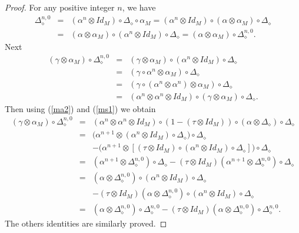 \documentclass{article}
\theoremstyle{definition}
\theoremstyle{remark}
\numberwithin{equation}{section}
\begin{document}
\begin{proof}
For any positive integer $n$, we have
 \begin{eqnarray}
  \Delta^{n,0}_\diamond&=&(\alpha^n\otimes Id_M)\circ\Delta_\diamond\circ\alpha_M
=(\alpha^n\otimes Id_M)\circ(\alpha\otimes\alpha_M)\circ\Delta_\diamond\nonumber\\
&=&(\alpha\otimes \alpha_M)\circ(\alpha^n\otimes Id_M)\circ\Delta_\diamond=(\alpha\otimes\alpha_M)\circ\Delta^{n,0}_\diamond.\nonumber
 \end{eqnarray}
Next
\begin{eqnarray}
(\gamma\otimes\alpha_M)\circ \Delta^{n,0}_\diamond
&=&(\gamma\otimes\alpha_M)\circ(\alpha^n\otimes Id_M)\circ\Delta_\diamond\nonumber\\
&=&(\gamma\circ\alpha^n\otimes\alpha_M)\circ\Delta_\diamond\nonumber\\
&=&(\gamma\circ(\alpha^n\otimes\alpha^n)\otimes\alpha_M)\circ\Delta_\diamond\nonumber\\
&=&(\alpha^n\otimes\alpha^n\otimes Id_M)\circ(\gamma\otimes\alpha_M)\circ\Delta_\diamond\nonumber.
\end{eqnarray}
Then using (\ref{ma2}) and (\ref{ms1}) we obtain
\begin{eqnarray}
 (\gamma\otimes\alpha_M)\circ\Delta^{n,0}_\diamond
&=&(\alpha^n\otimes\alpha^n\otimes Id_M)\circ(1-(\tau\otimes Id_M))\circ(\alpha\otimes\Delta_\diamond)\circ\Delta_\diamond\nonumber\\
&=&\Big(\alpha^{n+1}\otimes(\alpha^n\otimes Id_M)\circ\Delta_\diamond\Big)\circ\Delta_\diamond\nonumber\\
&&- \Big(\alpha^{n+1}\otimes[(\tau\otimes Id_M)\circ(\alpha^n\otimes Id_M)\circ\Delta_\diamond]\Big)\circ\Delta_\diamond\nonumber\\
&=&(\alpha^{n+1}\otimes\Delta^{n,0}_\diamond)\circ\Delta_\diamond-(\tau\otimes Id_M)(\alpha^{n+1}\otimes\Delta^{n,0}_\diamond)\circ\Delta_\diamond\nonumber\\
&=&(\alpha\otimes\Delta^{n,0}_\diamond)\circ(\alpha^n\otimes Id_M)\circ\Delta_\diamond\nonumber\\
&&-(\tau\otimes Id_M)(\alpha\otimes\Delta^{n,0}_\diamond)\circ(\alpha^n\otimes Id_M)\circ\Delta_\diamond\nonumber\\
&=&(\alpha\otimes\Delta^{n,0}_\diamond)\circ\Delta^{n,0}_\diamond-(\tau\otimes Id_M)(\alpha\otimes\Delta^{n,0}_\diamond)\circ\Delta^{n,0}_\diamond\nonumber.
\end{eqnarray}
The others identities are similarly proved.
\end{proof}
\end{document}
